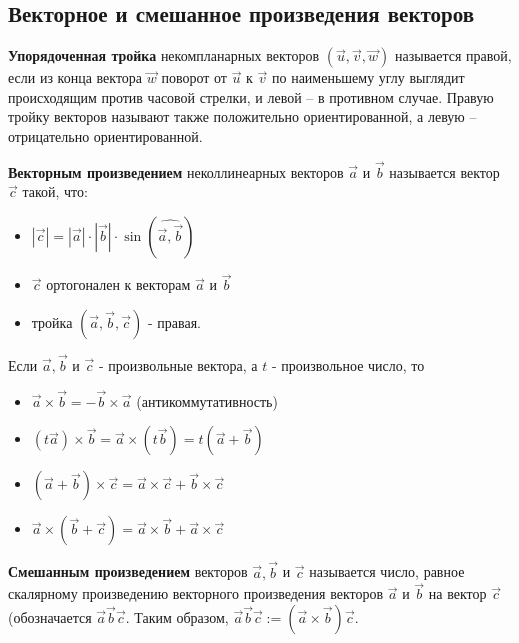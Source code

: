 \documentclass[a4paper]{article}
\begin{document}
\newpage \begin{center}\begin{Large}\end{Large}\end{center}
\subsection*{Векторное и смешанное произведения векторов}

\textbf{Упорядоченная тройка} некомпланарных векторов $(\vec{u}, \vec{v}, \vec{w})$  называется
правой, если из конца вектора $\vec{w}$ поворот от $\vec{u}$ к $\vec{v}$ по наименьшему углу
выглядит происходящим против часовой стрелки, и левой – в противном случае. Правую тройку векторов называют также положительно
ориентированной, а левую – отрицательно ориентированной.

\textbf{Векторным произведением} неколлинеарных векторов $\vec{a}$ и $\vec{b}$ называется
вектор $\vec{c}$ такой, что:
\begin{itemize}
\item $| \vec{c}| = | \vec{a} | \cdot | \vec{b} | \cdot \sin (\widehat{\vec{a}, \vec{b}})$
\item $\vec{c}$ ортогонален к векторам $\vec{a}$ и $\vec{b}$
\item тройка $(\vec{a}, \vec{b}, \vec{c})$ - правая.
\end{itemize}

Если $\vec{a}, \vec{b}$ и $\vec{c}$ - произвольные вектора, а $t$ - произвольное число, то
\begin{itemize}
\item $\vec{a} \times \vec{b} = -\vec{b} \times \vec{a}$ (антикоммутативность)
\item $(t \vec{a}) \times \vec{b} = \vec{a} \times (t \vec{b}) = t ( \vec{a} + \vec{b})$
\item $(\vec{a} +\vec{b}) \times \vec{c} = \vec{a} \times \vec{c} + \vec{b} \times \vec{c}$
\item $\vec{a} \times (\vec{b} + \vec{c}) = \vec{a} \times \vec{b} +\vec{a} \times \vec{c}$
\end{itemize}

\textbf{Смешанным произведением} векторов $\vec{a}, \vec{b}$ и $\vec{c}$ называется число, равное
скалярному произведению векторного произведения векторов $\vec{a}$ и $\vec{b}$
на вектор $\vec{c}$ (обозначается $\vec{a} \vec{b} \vec{c}$.
Таким образом, $\vec{a} \vec{b} \vec{c} := (\vec{a} \times \vec{b}) \vec{c}$.
\end{document}
